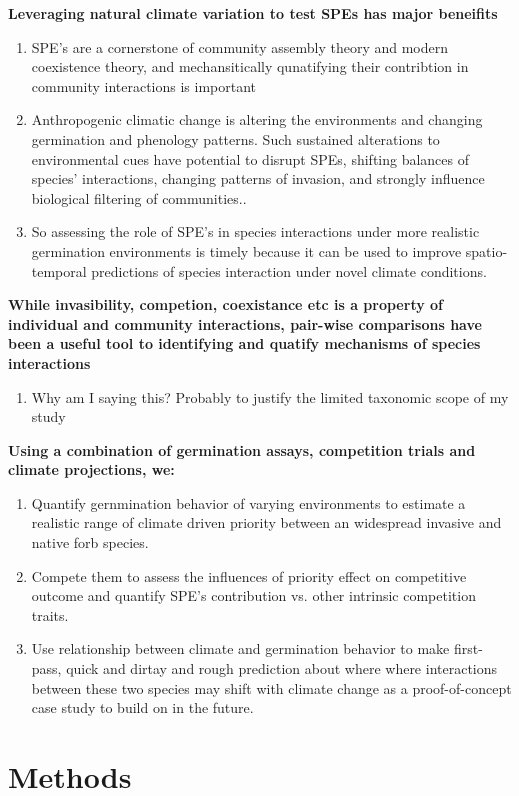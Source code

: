 \documentclass{article}\usepackage[]{graphicx}\usepackage[]{color}
\begin{document}
\textbf{Leveraging natural climate variation to test SPEs has major beneifits}
\begin{enumerate}
\item SPE's are a cornerstone of community assembly theory and modern coexistence theory, and mechansitically qunatifying their contribtion in community interactions is important
\item Anthropogenic climatic change is altering the  environments \citep{Walck2011} and changing  germination and phenology patterns. Such sustained alterations to environmental cues have potential to disrupt SPEs, shifting balances of species' interactions, changing patterns of invasion, and strongly influence biological filtering of communities..
\item So assessing the role of SPE's in species interactions under more realistic germination environments is timely because it can be used to improve spatio-temporal predictions of species interaction under novel climate conditions.
\end{enumerate}

\textbf{While invasibility, competion, coexistance etc is a property of individual and community interactions, pair-wise comparisons have been a useful tool to identifying and quatify mechanisms of species interactions}
\begin{enumerate}
\item Why am I saying this? Probably to justify the limited taxonomic scope of my study
\end{enumerate}

\textbf{Using a combination of germination assays, competition trials and climate projections, we:}
\begin{enumerate}
\item Quantify gernmination behavior of varying environments to estimate a realistic range of climate driven priority between an widespread invasive and native forb species. 
\item Compete them to assess the influences of priority effect on competitive outcome and quantify SPE's contribution vs. other intrinsic competition traits.
\item Use relationship between climate and germination behavior to make first-pass, quick and dirtay and rough prediction about where where interactions between these two species may shift with climate change as a proof-of-concept case study to build on in the future.
\end{enumerate}

\section*{Methods}
\end{document}

